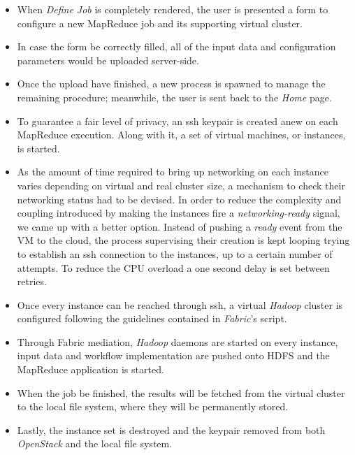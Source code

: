 \documentclass{sig-alternate}
\begin{document}
\begin{itemize}
 \item When \emph{Define Job} is completely rendered, the user is presented a form to configure a new MapReduce job and its supporting virtual cluster.
 
 \item In case the form be correctly filled, all of the input data and configuration parameters would be uploaded server-side.
 
 \item Once the upload have finished, a new process is spawned to manage the remaining procedure; meanwhile, the user is sent back to the \emph{Home} page.
 
 \item To guarantee a fair level of privacy, an ssh keypair is created anew on each MapReduce execution. Along with it, a set of virtual machines, or instances, is started.
 
 \item As the amount of time required to bring up networking on each instance varies depending on virtual and real cluster size, a mechanism to check their networking status had to be devised. In order to reduce the complexity and coupling introduced by making the instances fire a \emph{networking-ready} signal, we came up with a better option. Instead of pushing a \emph{ready} event from the VM to the cloud, the process supervising their creation is kept looping trying to establish an ssh connection to the instances, up to a certain number of attempts. To reduce the CPU overload a one second delay is set between retries.
 
 \item Once every instance can be reached through ssh, a virtual \emph{Hadoop} cluster is configured following the guidelines contained in \emph{Fabric}'s script.
 
 \item Through Fabric mediation, \emph{Hadoop} daemons are started on every instance, input data and workflow implementation are pushed onto HDFS and the MapReduce application is started.
 
 \item When the job be finished, the results will be fetched from the virtual cluster to the local file system, where they will be permanently stored.
 
 \item Lastly, the instance set is destroyed and the keypair removed from both \emph{OpenStack} and the local file system.
\end{itemize}
\end{document}
